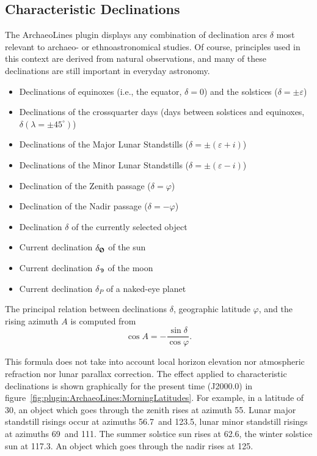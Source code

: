 \subsection{Characteristic Declinations}
\label{sec:plugin:ArchaeoLines:Declinations}


The ArchaeoLines plugin displays any combination of declination arcs $\delta$ most
relevant to archaeo- or ethnoastronomical studies. Of course, principles
used in this context are derived from natural observations, and many of
these declinations are still important in everyday astronomy.

\begin{itemize}
\item Declinations of equinoxes (i.e., the equator, $\delta=0$) and the solstices ($\delta=\pm\varepsilon$)
\item Declinations of the crossquarter days (days between solstices and equinoxes, $\delta(\lambda=\pm 45^\circ)$)
\item Declinations of the Major Lunar Standstills ($\delta=\pm(\varepsilon+i)$)
\item Declinations of the Minor Lunar Standstills ($\delta=\pm(\varepsilon-i)$)
\item Declination of the Zenith passage ($\delta=\varphi$)
\item Declination of the Nadir passage ($\delta=-\varphi$)
\item Declination $\delta$ of the currently selected object 
\item Current declination $\delta_{\text{\Sun}}$ of the sun
\item Current declination $\delta_{\text{\Moon}}$ of the moon
\item Current declination $\delta_P$ of a naked-eye planet
\end{itemize}

The principal relation between declinations $\delta$, geographic
latitude $\varphi$, and the rising azimuth $A$ is computed from
\begin{equation}
  \label{eq:RisingAzimuth}
  \cos A=-\frac{\sin\delta}{\cos\varphi}.
\end{equation}

This formula does not take into account local horizon elevation nor
atmospheric refraction nor lunar parallax correction.  The effect
applied to characteristic declinations is shown graphically for the
present time (J2000.0) in
figure~\ref{fig:plugin:ArchaeoLines:MorningLatitudes}. For example, in
a latitude of 30\degree, an object which goes through the zenith rises
at azimuth 55\degree. Lunar major standstill risings occur at azimuths
56.7\degree\ and 123.5\degree, lunar minor standstill risings at
azimuths 69\degree\ and 111\degree. The summer solstice sun rises at
62.6\degree, the winter solstice sun at 117.3\degree. An object which goes
through the nadir rises at 125\degree.  

